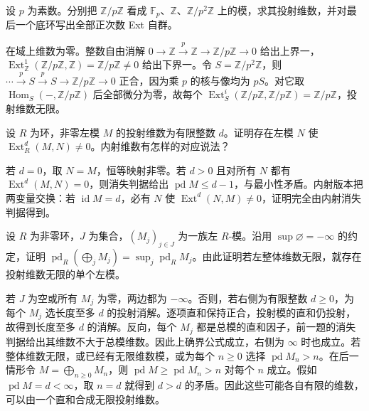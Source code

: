 \begin{exercise}\label{b4:ex:10-three-base-rings}
	设 \(p\) 为素数。分别把 \(\mathbb Z/p\mathbb Z\) 看成 \(\mathbb F_p\)、\(\mathbb Z\)、\(\mathbb Z/p^2\mathbb Z\) 上的模，求其投射维数，并对最后一个底环写出全部正次数 Ext 自群。
\end{exercise}
\begin{solution}
	在域上维数为零。整数自由消解 \(0\to\mathbb Z\xrightarrow{p}\mathbb Z\to\mathbb Z/p\mathbb Z\to0\) 给出上界一，\(\operatorname{Ext}_{\mathbb Z}^1(\mathbb Z/p\mathbb Z,\mathbb Z)=\mathbb Z/p\mathbb Z\ne0\) 给出下界一。令 \(S=\mathbb Z/p^2\mathbb Z\)，则 \(\cdots\xrightarrow{p}S\xrightarrow{p}S\to\mathbb Z/p\mathbb Z\to0\) 正合，因为乘 \(p\) 的核与像均为 \(pS\)。对它取 \(\operatorname{Hom}_S(-,\mathbb Z/p\mathbb Z)\) 后全部微分为零，故每个 \(\operatorname{Ext}_S^i(\mathbb Z/p\mathbb Z,\mathbb Z/p\mathbb Z)=\mathbb Z/p\mathbb Z\)，投射维数无限。
\end{solution}

\begin{exercise}\label{b4:ex:10-detect-last-degree}
	设 \(R\) 为环，非零左模 \(M\) 的投射维数为有限整数 \(d\)。证明存在左模 \(N\) 使 \(\operatorname{Ext}_R^d(M,N)\ne0\)。内射维数有怎样的对应说法？
\end{exercise}
\begin{solution}
	若 \(d=0\)，取 \(N=M\)，恒等映射非零。若 \(d>0\) 且对所有 \(N\) 都有 \(\operatorname{Ext}^d(M,N)=0\)，则消失判据给出 \(\operatorname{pd}M\le d-1\)，与最小性矛盾。内射版本把两变量交换：若 \(\operatorname{id}M=d\)，必有 \(N\) 使 \(\operatorname{Ext}^d(N,M)\ne0\)，证明完全由内射消失判据得到。
\end{solution}

\begin{exercise}\label{b4:ex:10-global-dimension-attained}
	设 \(R\) 为非零环，\(J\) 为集合，\((M_j)_{j\in J}\) 为一族左 \(R\)-模。沿用 \(\sup\varnothing=-\infty\) 的约定，证明 \(\operatorname{pd}_R(\bigoplus_jM_j)=\sup_j\operatorname{pd}_RM_j\)。由此证明若左整体维数无限，就存在投射维数无限的单个左模。
\end{exercise}
\begin{solution}
	若 \(J\) 为空或所有 \(M_j\) 为零，两边都为 \(-\infty\)。否则，若右侧为有限整数 \(d\ge0\)，为每个 \(M_j\) 选长度至多 \(d\) 的投射消解。逐项直和保持正合，投射模的直和仍投射，故得到长度至多 \(d\) 的消解。反向，每个 \(M_j\) 都是总模的直和因子，前一题的消失判据给出其维数不大于总模维数。因此上确界公式成立，右侧为 \(\infty\) 时也成立。若整体维数无限，或已经有无限维数模，或为每个 \(n\ge0\) 选择 \(\operatorname{pd}M_n>n\)。在后一情形令 \(M=\bigoplus_{n\ge0}M_n\)，则 \(\operatorname{pd}M\ge\operatorname{pd}M_n>n\) 对每个 \(n\) 成立。假如 \(\operatorname{pd}M=d<\infty\)，取 \(n=d\) 就得到 \(d>d\) 的矛盾。因此这些可能各自有限的维数，可以由一个直和合成无限投射维数。
\end{solution}


